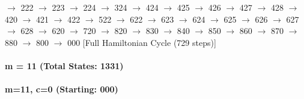 $\rightarrow$ 222 $\rightarrow$ 223 $\rightarrow$ 224 $\rightarrow$ 324 $\rightarrow$ 424 $\rightarrow$ 425 $\rightarrow$ 426 $\rightarrow$ 427 $\rightarrow$ 428 $\rightarrow$ 420 $\rightarrow$ 421 $\rightarrow$ 422 $\rightarrow$ 522 $\rightarrow$ 622 $\rightarrow$ 623 $\rightarrow$ 624 $\rightarrow$ 625 $\rightarrow$ 626 $\rightarrow$ 627 $\rightarrow$ 628 $\rightarrow$ 620 $\rightarrow$ 720 $\rightarrow$ 820 $\rightarrow$ 830 $\rightarrow$ 840 $\rightarrow$ 850 $\rightarrow$ 860 $\rightarrow$ 870 $\rightarrow$ 880 $\rightarrow$ 800 $\rightarrow$ 000 [Full Hamiltonian Cycle (729 steps)]

\paragraph{ m = 11 (Total States: 1331)}


\paragraph{m=11, c=0 (Starting: 000)}


